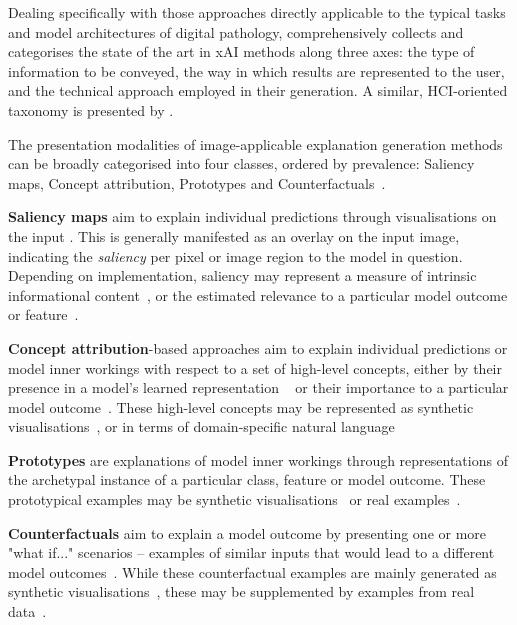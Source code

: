 \documentclass[final,5p,times,twocolumn,hyphens]{elsarticle}
\begin{document}
Dealing specifically with those approaches directly applicable to the typical tasks and model architectures of digital pathology, \citet{poceviciute_survey_2020} comprehensively collects and categorises the state of the art in xAI methods along three axes: the type of information to be conveyed, the way in which results are represented to the user, and the technical approach employed in their generation. A similar, HCI-oriented taxonomy is presented by \citet{liao2020questioning}. 

The presentation modalities of image-applicable explanation generation methods can be broadly categorised into four classes, ordered by prevalence: Saliency maps, Concept attribution, Prototypes and Counterfactuals~\cite{bodria_benchmarking_2021}.

\textbf{Saliency maps} aim to explain individual predictions through visualisations on the input \cite{MorchEtAl:1995:Saliency}. This is generally manifested as an overlay on the input image, indicating the \textit{saliency} per pixel or image region to the model in question. Depending on implementation, saliency may represent a measure of intrinsic informational content~\cite{KadirBrady:2001:Saliency}, or the estimated relevance to a particular model outcome or feature~\cite{SimonyanVedaldiZisserman:2013:DeepInside, springenberg2014striving, yosinski2015deepvisualization, LapuschkinEtAl:2016:LRP, selvaraju2017grad, ribeiro2018anchors}.

\textbf{Concept attribution}-based approaches aim to explain individual predictions or model inner workings with respect to a set of high-level concepts, either by their presence in a model's learned representation ~\cite{GrazianiHenning:2020:ConceptAttribution} or their importance to a particular model outcome~\cite{kim2018interpretability}. These high-level concepts may be represented as synthetic visualisations~\cite{erhan2009visualizing, yosinski2015deepvisualization}, or in terms of domain-specific natural language~\cite{GrazianiHenning:2020:ConceptAttribution, kim2018interpretability} 

\textbf{Prototypes} are explanations of model inner workings through representations of the archetypal instance of a particular class, feature or model outcome. These prototypical examples may be synthetic visualisations~\cite{li2018deep} or real examples~\cite{kim2016examples}.

\textbf{Counterfactuals} aim to explain a model outcome by presenting one or more "what if..." scenarios -- examples of similar inputs that would lead to a different model outcomes~\cite{ginsberg1986counterfactuals}. While these counterfactual examples are mainly generated as synthetic visualisations~\cite{seah2019chest, poceviciute_survey_2020, liu2019generative}, these may be supplemented by examples from real data~\cite{gulshad2021counterfactual}.
\end{document}
